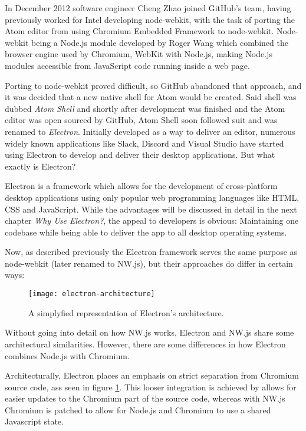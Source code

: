 In December 2012 software engineer Cheng Zhao joined GitHub's team, having previously worked for Intel developing
node-webkit, with the task of porting the Atom editor from using Chromium Embedded Framework to node-webkit.
Node-webkit being a Node.js module developed by Roger Wang which combined the browser engine used by Chromium, WebKit 
with Node.js, making Node.js modules accessible from JavaScript code running inside a web page.\cite{jensen2017}\par

Porting to node-webkit proved difficult, so GitHub abandoned that approach, and it was decided that a new native shell
for Atom would be created.
Said shell was dubbed \emph{Atom Shell} and shortly after development was finished and the Atom editor was open sourced
by GitHub, Atom Shell soon followed suit and was renamed to \emph{Electron}.
Initially developed as a way to deliver an editor, numerous widely known applications like Slack, Discord and Visual
Studio have started using Electron to develop and deliver their desktop applications.
But what exactly is Electron?\par
Electron is a framework which allows for the development of cross-platform desktop applications using only popular 
web programming languages like HTML, CSS and JavaScript. 
While the advantages will be discussed in detail in the next chapter \emph{Why Use Electron?}, the appeal to developers
is obvious: Maintaining one codebase while being able to deliver the app to all desktop operating systems.\par
Now, as described previously the Electron framework serves the same purpose as node-webkit (later renamed to NW.js), but
their approaches do differ in certain ways:\cite{jensen2017}
\begin{figure}[h]
    \label{fig:el-architecture}
    \caption{A simplyfied representation of Electron's architecture.\cite{jensen2017}}
    \texttt{[image: electron-architecture]}
\end{figure}
Without going into detail on how NW.js works, Electron and NW.js share some architectural similarities.
However, there are some differences in how Electron combines Node.js with Chromium.\par
Architecturally, Electron places an emphasis on strict separation from Chromium source code, ass seen in figure \ref{fig:el-architecture}.
This looser integration is achieved by  allows for easier updates to the Chromium part of the source code, whereas with NW.js Chromium
is patched to allow for Node.js and Chromium to use a shared Javascript state.\cite{jensen2017}
